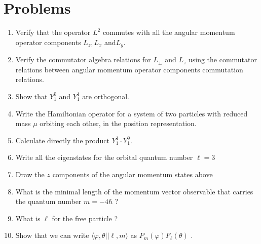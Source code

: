 \section{Problems}
\begin{enumerate}
	\item Verify that the operator $L^2$ commutes with all the angular momentum operator components $L_z,L_x$ and$ L_y$.
	\item Verify the commutator algebra relations for $L_\pm$ and $L_z$ using the commutator relations between angular momentum operator components commutation relations.
	\item Show that $ Y ^0_1$ and $Y^1_1$ are orthogonal. 
	\item Write the Hamiltonian operator for a system of two particles with reduced mass $\mu$ orbiting each other, in the position representation.
	\item Calculate directly the product $ Y ^1_1 \cdot Y ^0_1$.
	\item Write all the eigenstates for the orbital quantum number $ \ell = 3$ 
	\item Draw the $z$ components of the angular momentum states above
	\item What is the  minimal length of the momentum vector observable that carries the quantum number $ m= -4 \hbar$ ?
	\item What is $\ell$ for the free particle ? 
	\item Show that we can write $ \langle \varphi, \theta | | \ell, m\rangle$ as $ P_m( \varphi) F_\ell ( \theta)$ . 
\end{enumerate}